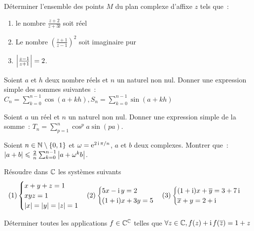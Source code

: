 \begin{exercice}
    Déterminer l'ensemble des points \(M\) du plan complexe d'affixe \(z\) tels que~:
    \begin{enumerate}
        \item le nombre \(\frac{z+2}{z+3\ii}\) soit réel
        \item Le nombre \(\left(\frac{z+1}{z-1}\right)^2\) soit imaginaire pur
        \item \(\left\lvert\frac{z-1}{z+1}\right\rvert=2\).
    \end{enumerate}
\end{exercice}
\begin{exercice}
    Soient \(a\) et \(h\) deux nombre réels et \(n\) un naturel non nul. Donner une expression simple des sommes suivantes~: \( C_n = \sum_{k=0}^{n-1} \cos(a+kh), S_n = \sum_{k=0}^{n-1} \sin(a+kh)\)
\end{exercice}
\begin{exercice}
    Soient \(a\) un réel et \(n\) un naturel non nul. Donner une expression simple de la somme~: \(T_n = \sum_{p=1}^n \cos^p a \sin(pa)\).
\end{exercice}
\begin{exercice}
    Soient \(n \in \mathbb{N}\setminus\{0,1\}\) et \(\omega = \operatorname{e}^{2\operatorname{i}\pi/n}\), \(a\) et \(b\) deux complexes. Montrer que~:
\(\left\lvert a+b\right\rvert \leqslant \frac{2}{n} \sum_{k=0}^{n-1} \left\lvert a+\omega^k b\right\rvert\).
\end{exercice}
\begin{exercice}
    Résoudre dans \(\mathbb{C}\) les systèmes suivants
    \begin{equation}
        (1) \begin{cases} x+y+z=1 \\ xyz=1 \\ \left\lvert x\right\rvert=\left\lvert y\right\rvert=\left\lvert z\right\rvert=1 \end{cases}
        (2) \begin{cases} 5x-\operatorname{i}{}y=2 \\ (1+\operatorname{i})x+3y=5 \end{cases}
        (3) \begin{cases} (1+\operatorname{i})x+\overline{y} = 3+7\operatorname{i} \\\overline{x}+y=2+\operatorname{i}\end{cases}
    \end{equation}
\end{exercice}
\begin{exercice}
    Déterminer toutes les applications \(f \in \mathbb{C}^{\mathbb{C}}\) telles que \(\forall z \in \mathbb{C}, f(z)+\operatorname{i} f(\overline{z}) = 1+z\)
\end{exercice}
